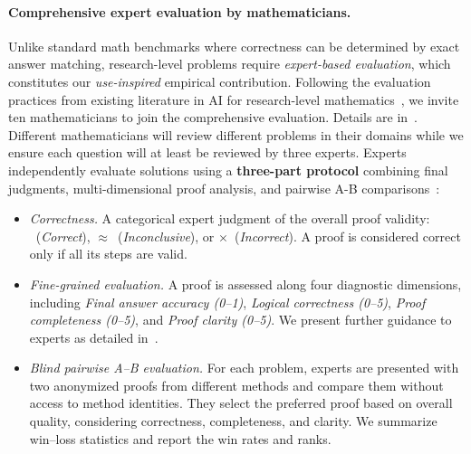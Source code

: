 \documentclass{article}
\begin{document}
\paragraph{Comprehensive expert evaluation by mathematicians.}
Unlike standard math benchmarks where correctness can be determined by exact answer matching, research-level problems require \emph{expert-based evaluation}, which constitutes our \emph{use-inspired} empirical contribution. Following the evaluation practices from existing literature in AI for research-level mathematics~\cite{aletheia}, we invite ten mathematicians to join the comprehensive evaluation. Details are in~. Different mathematicians will review different problems in their domains while we ensure each question will at least be reviewed by three experts. Experts independently evaluate solutions using a \textbf{three-part protocol} combining final judgments, multi-dimensional proof analysis, and pairwise A-B comparisons~\cite{ouyang2022training}:
\vspace{-4pt}
\begin{itemize}[leftmargin=18pt]
\item[(a)] \emph{Correctness.} A categorical expert judgment of the overall proof validity:
\checkmark~(\emph{Correct}), $\approx$~(\emph{Inconclusive}), or $\times$~(\emph{Incorrect}).
A proof is considered correct only if all its steps are valid.
\item[(b)] \emph{Fine-grained evaluation.} A proof is assessed along four diagnostic dimensions, including \emph{Final answer accuracy (0--1)}, \emph{Logical correctness (0--5)}, \emph{Proof completeness (0--5)}, and \emph{Proof clarity (0--5)}. We present further guidance to experts as detailed in~.
\item[(c)] \emph{Blind pairwise A--B evaluation.}
For each problem, experts are presented with two anonymized proofs from different methods and compare them without access to method identities. They select the preferred proof based on overall quality, considering correctness, completeness, and clarity. We summarize win--loss statistics and report the win rates and ranks.


\end{itemize}
\vspace{-10pt}
\end{document}

